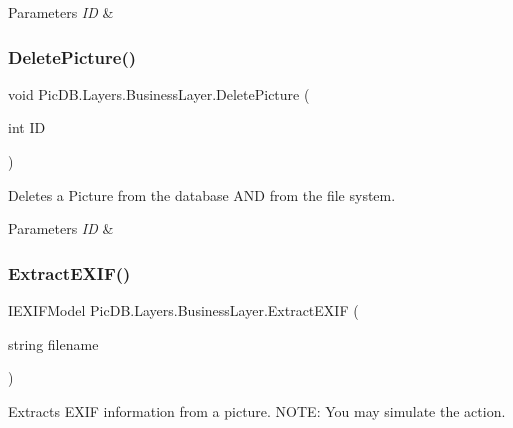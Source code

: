 \begin{DoxyParams}{Parameters}
{\em ID} & \\
\hline
\end{DoxyParams}
\mbox{\label{class_pic_d_b_1_1_layers_1_1_business_layer_acdb10f071983ced2a68835ff464779ed}} 
\subsubsection{\texorpdfstring{Delete\+Picture()}{DeletePicture()}}
{\footnotesize\ttfamily void Pic\+D\+B.\+Layers.\+Business\+Layer.\+Delete\+Picture (\begin{DoxyParamCaption}\item[{int}]{ID }\end{DoxyParamCaption})}



Deletes a Picture from the database A\+ND from the file system. 


\begin{DoxyParams}{Parameters}
{\em ID} & \\
\hline
\end{DoxyParams}
\mbox{\label{class_pic_d_b_1_1_layers_1_1_business_layer_aa6e80066866a071f5801fa73138326e3}} 
\subsubsection{\texorpdfstring{Extract\+E\+X\+I\+F()}{ExtractEXIF()}}
{\footnotesize\ttfamily I\+E\+X\+I\+F\+Model Pic\+D\+B.\+Layers.\+Business\+Layer.\+Extract\+E\+X\+IF (\begin{DoxyParamCaption}\item[{string}]{filename }\end{DoxyParamCaption})}



Extracts E\+X\+IF information from a picture. N\+O\+TE\+: You may simulate the action. 


